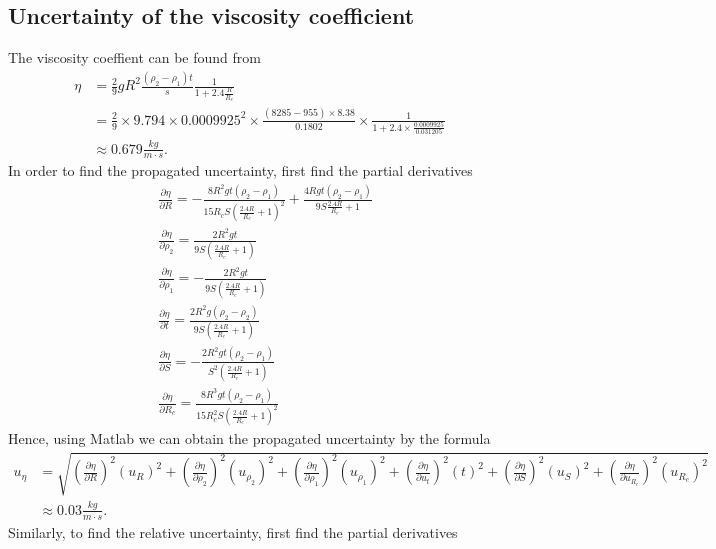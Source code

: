 \subsection{Uncertainty of the viscosity coefficient}
    The viscosity coeffient can be found from
    \[
    \begin{split}
        \eta&=\frac{2}{9}gR^2\frac{(\rho_2-\rho_1)t}{s}\frac{1}{1+2.4\frac{R}{R_c}}\\
            &=\frac{2}{9}\times 9.794\times 0.0009925^2\times \frac{(8285-955)\times 8.38}{0.1802}\times \frac{1}{1+2.4\times \frac{0.0009925}{0.031205}}\\
            &\approx 0.679\frac{kg}{m\cdot s}.
    \end{split}
    \]
    In order to find the propagated uncertainty, first find the partial derivatives
    \[
    \begin{split}
        &\frac{\partial\eta}{\partial R}=- \frac{8R^{2}gt(\rho_2-\rho_1)}{15R_{c}S(\frac{2.4R}{R_{c}}+1)^2} + \frac{4Rgt(\rho_2-\rho_1)}{9S\frac{2.4R}{R_{c}}+1}\\
        &\frac{\partial\eta}{\partial \rho_2}=\frac{2R^{2} g t}{9S(\frac{2.4 R}{R_{c}} + 1)}\\
        &\frac{\partial\eta}{\partial \rho_1}=-\frac{2R^{2} g t}{9S(\frac{2.4 R}{R_{c}} + 1)}\\
        &\frac{\partial\eta}{\partial t}=\frac{2R^2 g (\rho_2-\rho_2)}{9S (\frac{2.4 R}{R_{c}}+1)}\\
        &\frac{\partial\eta}{\partial S}=-\frac{2R^2 g t (\rho_{2} - \rho_{1})}{S^{2} (\frac{2.4 R}{R_{c}} + 1)}\\
        &\frac{\partial\eta}{\partial R_c}=\frac{8R^{3} g t (\rho_{2} - \rho_{1})}{15R_{c}^{2} S (\frac{2.4 R}{R_{c}} + 1)^{2}}
    \end{split}
    \]
    Hence, using Matlab we can obtain the propagated uncertainty by the formula
    \[
    \begin{split}
        u_{\eta}&=\sqrt{(\frac{\partial\eta}{\partial R})^2(u_R)^2+(\frac{\partial\eta}{\partial \rho_2})^2(u_{\rho_2})^2+(\frac{\partial\eta}{\partial \rho_1})^2(u_{\rho_1})^2+(\frac{\partial\eta}{\partial u_t})^2(t)^2+(\frac{\partial\eta}{\partial S})^2(u_S)^2+(\frac{\partial\eta}{\partial u_{R_c}})^2(u_{R_c})^2}\\
        &\approx 0.03\frac{kg}{m\cdot s}.
    \end{split}
    \]
    Similarly, to find the relative uncertainty, first find the partial derivatives
